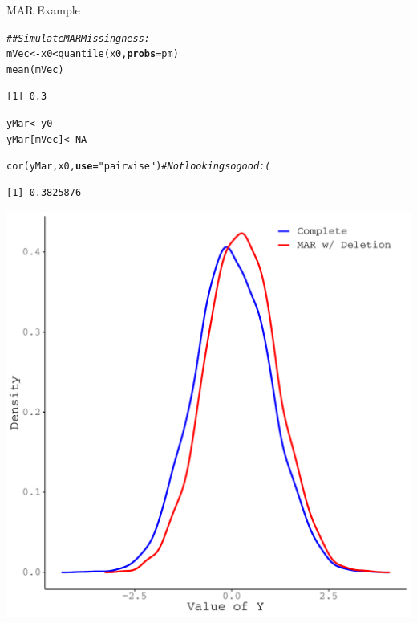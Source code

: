 \documentclass{beamer}\usepackage[]{graphicx}\usepackage[]{color}
\makeatletter
\newcommand{\hlnum}[1]{\textcolor[rgb]{0.69,0.494,0}{#1}}%
\newcommand{\hlstr}[1]{\textcolor[rgb]{0.749,0.012,0.012}{#1}}%
\newcommand{\hlcom}[1]{\textcolor[rgb]{0.514,0.506,0.514}{\textit{#1}}}%
\newcommand{\hlopt}[1]{\textcolor[rgb]{0,0,0}{#1}}%
\newcommand{\hlstd}[1]{\textcolor[rgb]{0,0,0}{#1}}%
\newcommand{\hlkwb}[1]{\textcolor[rgb]{0,0.341,0.682}{#1}}%
\newcommand{\hlkwc}[1]{\textcolor[rgb]{0,0,0}{\textbf{#1}}}%
\newcommand{\hlkwd}[1]{\textcolor[rgb]{0.004,0.004,0.506}{#1}}%
\newenvironment{kframe}{%
 \def\at@end@of@kframe{}%
 \ifinner\ifhmode%
  \def\at@end@of@kframe{\end{minipage}}%
  \begin{minipage}{\columnwidth}%
 \fi\fi%
 \def\FrameCommand##1{\hskip\@totalleftmargin \hskip-\fboxsep
 \colorbox{shadecolor}{##1}\hskip-\fboxsep
     \hskip-\linewidth \hskip-\@totalleftmargin \hskip\columnwidth}%
 \MakeFramed {\advance\hsize-\width
   \@totalleftmargin\z@ \linewidth\hsize
   \@setminipage}}%
 {\par\unskip\endMakeFramed%
 \at@end@of@kframe}
\newenvironment{knitrout}{}{} %
\makeatother
\begin{document}
\begin{frame}{MAR Example}
  
\begin{knitrout}\footnotesize
{}\color{fgcolor}\begin{kframe}
\begin{alltt}
\hlcom{## Simulate MAR Missingness:}
\hlstd{mVec} \hlkwb{<-} \hlstd{x0} \hlopt{<} \hlkwd{quantile}\hlstd{(x0,} \hlkwc{probs} \hlstd{= pm)}
\hlkwd{mean}\hlstd{(mVec)}
\end{alltt}
\begin{verbatim}
[1] 0.3
\end{verbatim}
\begin{alltt}
\hlstd{yMar}       \hlkwb{<-} \hlstd{y0}
\hlstd{yMar[mVec]} \hlkwb{<-} \hlnum{NA}

\hlkwd{cor}\hlstd{(yMar, x0,} \hlkwc{use} \hlstd{=} \hlstr{"pairwise"}\hlstd{)} \hlcom{# Not looking so good :(}
\end{alltt}
\begin{verbatim}
[1] 0.3825876
\end{verbatim}
\end{kframe}
\end{knitrout}

\pagebreak

\begin{knitrout}\footnotesize
{}\color{fgcolor}

{\centering \includegraphics[width=0.65\linewidth]{figure/intro-unnamed-chunk-14-1} 

}


\end{knitrout}

\end{frame}
\end{document}
